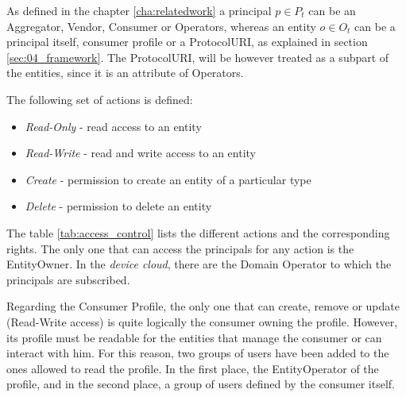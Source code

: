 As defined in the chapter \ref{cha:relatedwork} a principal $p \in P_{t}$ can be an Aggregator, Vendor, Consumer or Operators, whereas an entity $o \in O_{t}$ can be a principal itself, consumer profile or a ProtocolURI, as explained in section \ref{sec:04_framework}. The ProtocolURI, will be however treated as a subpart of the entities, since it is an attribute of Operators. 

The following set of actions is defined:
\begin{itemize}
	\item \textit{Read-Only} - read access to an entity
	\item \textit{Read-Write} - read and write access to an entity
	\item \textit{Create} - permission to create an entity of a particular type
	\item \textit{Delete} - permission to delete an entity
\end{itemize} 

\vspace{0.5em}
The table \ref{tab:access_control} lists the different actions and the corresponding rights. The only one that can access the principals for any action is the EntityOwner. In the \emph{device cloud}, there are the Domain Operator to which the principals are subscribed.

Regarding the Consumer Profile, the only one that can create, remove or update (Read-Write access) is quite logically the consumer owning the profile. However, its profile must be readable for the entities that manage the consumer or can interact with him. For this reason, two groups of users have been added to the ones allowed to read the profile. In the first place, the EntityOperator of the profile, and in the second place, a group of users defined by the consumer itself.


